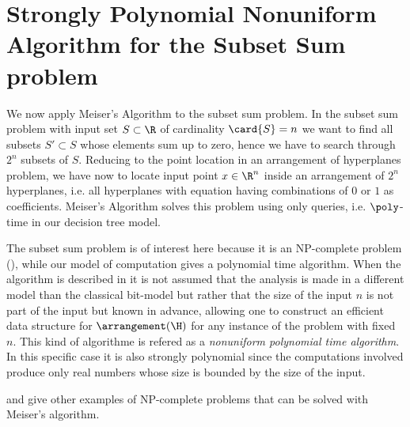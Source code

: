 \section{Strongly Polynomial Nonuniform Algorithm for the Subset Sum problem}

We now apply Meiser's Algorithm to the subset sum problem. In the subset sum
problem with input set $S \subset \R$ of cardinality $\card{S} = n$ we want to
find all subsets $S' \subset S$ whose elements sum up to zero, hence we have
to search through $2^n$ subsets of $S$. Reducing to the point location in an
arrangement of hyperplanes problem, we have now to locate input point $x \in
\R^n$ inside an arrangement of $2^n$ hyperplanes, i.e. all hyperplanes with
equation having combinations of $0$ or $1$ as coefficients. Meiser's Algorithm
solves this problem using only  queries, i.e. $\poly$-time
in our decision tree model.

The subset sum problem is of interest here because it is an NP-complete problem
(\cite{karp:1972}), while our model of computation gives a polynomial time
algorithm. When the algorithm is described in \cite{burgisser:1997} it is not
assumed that the analysis is made in a different model than the classical
bit-model but rather that the size of the input $n$ is not part of the input
but known in advance, allowing one to construct an efficient data structure for
$\arrangement(\H)$ for any instance of the problem with fixed $n$. This kind of
algorithme is refered as a \emph{nonuniform polynomial time algorithm}.  In
this specific case it is also strongly polynomial since the computations
involved produce only real numbers whose size is bounded by the size of the
input.

\cite{burgisser:1997} and \cite{meiser:1993} give other examples of
NP-complete problems that can be solved with Meiser's algorithm.
